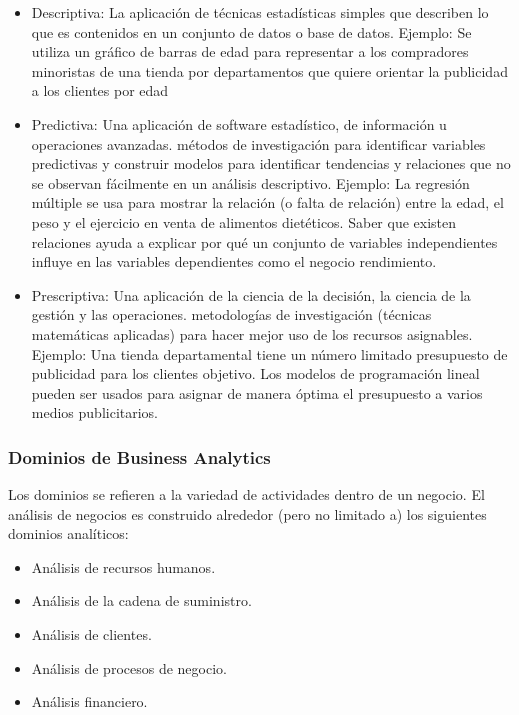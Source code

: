 \documentclass[twoside,twocolumn]{article}
\begin{document}
\begin{itemize}
    \item   Descriptiva: La aplicación de técnicas estadísticas simples que describen lo que es contenidos en un conjunto de datos o base de datos. Ejemplo: Se utiliza un gráfico de barras de edad para representar a los compradores minoristas de una tienda por departamentos que quiere orientar la publicidad a los clientes por edad
    \item   Predictiva: Una aplicación de software estadístico, de información u operaciones avanzadas. métodos de investigación para identificar variables predictivas y construir modelos para identificar tendencias y relaciones que no se observan fácilmente en un análisis descriptivo. Ejemplo: La regresión múltiple se usa para mostrar la relación (o falta de relación) entre la edad, el peso y el ejercicio en venta de alimentos dietéticos. Saber que existen relaciones ayuda a explicar por qué un conjunto de variables independientes influye en las variables dependientes como el negocio rendimiento.
    \item   Prescriptiva: Una aplicación de la ciencia de la decisión, la ciencia de la gestión y las operaciones. metodologías de investigación (técnicas matemáticas aplicadas) para hacer mejor uso de los recursos asignables. Ejemplo: Una tienda departamental tiene un número limitado presupuesto de publicidad para los clientes objetivo. Los modelos de programación lineal pueden ser usados para asignar de manera óptima el presupuesto a varios medios publicitarios.
\end{itemize}

\subsubsection{Dominios de Business Analytics}
Los dominios se refieren a la variedad de actividades dentro de un negocio. El análisis de negocios es construido alrededor (pero no limitado a) los siguientes dominios analíticos:
\begin{itemize}
    \item   Análisis de recursos humanos.
    \item   Análisis de la cadena de suministro.
    \item   Análisis de clientes.
    \item   Análisis de procesos de negocio.
    \item   Análisis financiero.
\end{itemize}
\end{document}
